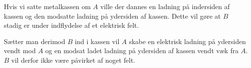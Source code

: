 Hvis vi satte metalkassen om $A$ ville der dannes en ladning på indersiden af kassen og den modsatte ladning på ydersiden af kassen. Dette vil gøre at $B$ stadig er under indflydelse af et elektrisk felt.

Sætter man derimod $B$ ind i kassen vil $A$ skabe en elektrisk ladning på ydersiden vendt mod $A$ og en modsat ladet ladning på ydersiden af kassen vendt væk fra $A$. $B$ vil derfor ikke være påvirket af noget felt.
